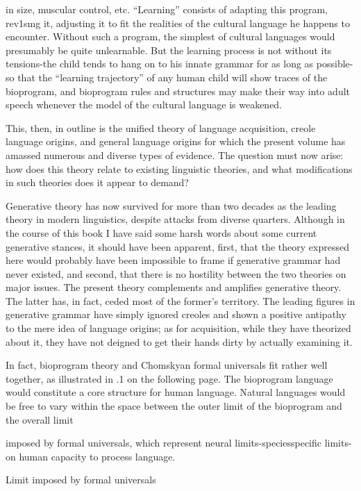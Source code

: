 in size, muscular control, etc. ``Learning'' consists of adapting this program, rev1smg it, adjusting it to fit the realities of the cultural language he happens to encounter. Without such a program, the sim\-plest of cultural languages would presumably be quite unlearnable. But the learning process is not without its tensions-the child tends to hang on to his innate grammar for as long as possible- so that the ``learning trajectory'' of any human child will show traces of the bioprogram, and bioprogram rules and structures may make their way into adult speech whenever the model of the cultural language is weakened.

This, then, in outline is the unified theory of language acquisi\-tion, creole language origins, and general language origins for which the present volume has amassed numerous and diverse types of evi\-dence. The question must now arise: how does this theory relate to existing linguistic theories, and what modifications in such theories does it appear to demand?

Generative theory has now survived for more than two decades as the leading theory in modern linguistics, despite attacks from diverse quarters. Although in the course of this book I have said some harsh words about some current generative stances, it should have been apparent, first, that the theory expressed here would probably have been impossible to frame if generative grammar had never existed, and second, that there is no hostility between the two theories on major issues. The present theory complements and amplifies generative theory. The latter has, in fact, ceded most of the former's territory. The leading figures in generative grammar have simply ignored creoles and shown a positive antipathy to the mere idea of language origins; as for acquisition, while they have theorized about it, they have not deigned to get their hands dirty by actually examining it.

In fact, bioprogram theory and Chomskyan formal universals fit rather well together, as illustrated in .1 on the following page. The bioprogram language would constitute a core structure for human language. Natural languages would be free to vary within the space between the outer limit of the bioprogram and the overall limit


imposed by formal universals, which represent neural limits-species\-specific limits-on human capacity to process language.

Limit imposed by formal universals

